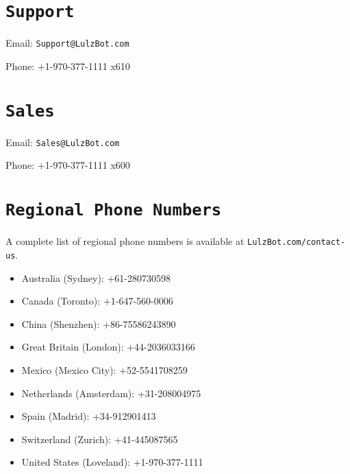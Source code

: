 %
%
%
%
%

\section{\texttt{Support}}
\setlength{\parindent}{0pt}
Email: \texttt{Support@LulzBot.com}

Phone: +1-970-377-1111 x610

\section{\texttt{Sales}}

Email: \texttt{Sales@LulzBot.com}

Phone: +1-970-377-1111 x600

\section{\texttt{Regional Phone Numbers}}\label{regional-phone-numbers}
A complete list of regional phone numbers is available at \texttt{LulzBot.com/contact-us}. 
\begin{itemize}
\item Australia﻿ (Sydney﻿): +61-280730598
\item Canada (Toronto): +1-647-560-0006
\item China (Shenzhen): +86-75586243890
\item Great Britain (London﻿)﻿: +44-2036033166﻿
\item Mexico (Mexico City﻿)﻿: +52-5541708259
\item Netherlands (Amsterdam﻿)﻿: +31-208004975
\item Spain﻿ (Madrid﻿): +34-912901413﻿
\item Switzerland﻿ (Zurich﻿)﻿: +41-445087565
\item United States (Loveland): +1-970-377-1111
\end{itemize}

